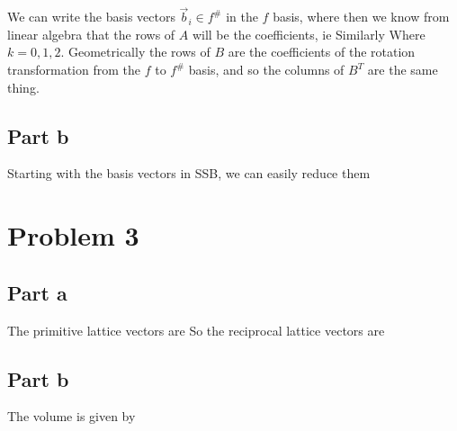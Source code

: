 We can write the basis vectors $\Vec{b}_i \in f^\#$ in the $f$ basis, where
then we know from linear algebra that the rows of $A$ will be the coefficients, ie
Similarly
Where $k = 0,1,2$. Geometrically the rows of $B$ are the coefficients of the rotation transformation from the $f$ to $f^\#$ basis, and so the columns of $B^T$ are the same thing.

\subsection*{Part b}
Starting with the basis vectors in SSB, we can easily reduce them
\pagebreak
\section*{Problem 3}
\subsection*{Part a}
The primitive lattice vectors are
So the reciprocal lattice vectors are

\subsection*{Part b}
The volume is given by
